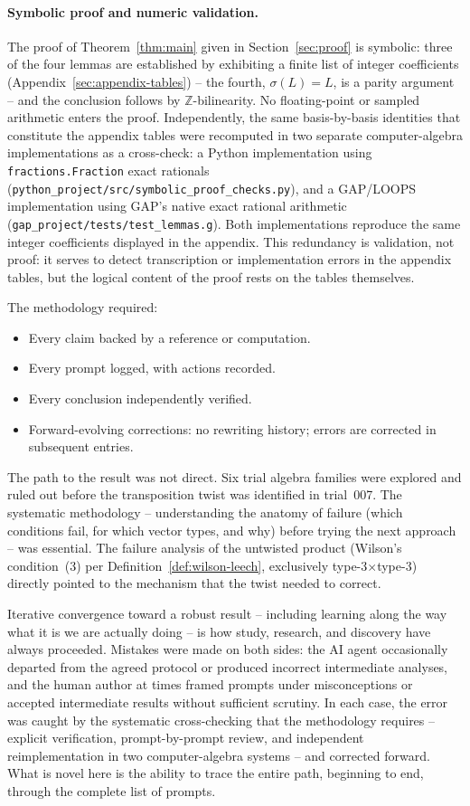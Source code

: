 \documentclass[twoside,english]{paper}
\numberwithin{equation}{section}
\numberwithin{figure}{section}
\theoremstyle{definition}
\theoremstyle{remark}
\newcommand{\ZZ}{\mathbb{Z}}
\begin{document}
\paragraph{Symbolic proof and numeric validation.}
The proof of Theorem~\ref{thm:main} given in Section~\ref{sec:proof}
is symbolic: three of the four lemmas are established by exhibiting a
finite list of integer coefficients (Appendix~\ref{sec:appendix-tables})
-- the fourth, $\sigma(L) = L$, is a parity argument -- and the
conclusion follows by $\ZZ$-bilinearity.  No floating-point
or sampled arithmetic enters the proof.  Independently, the same
basis-by-basis identities that constitute the appendix tables were
recomputed in two separate computer-algebra implementations as a
cross-check: a Python implementation using
\texttt{fractions.Fraction} exact rationals
(\texttt{python\_project/src/symbolic\_proof\_checks.py}), and a
GAP/LOOPS implementation using GAP's native exact rational arithmetic
(\texttt{gap\_project/tests/test\_lemmas.g}).  Both implementations
reproduce the same integer coefficients displayed in the appendix.
This redundancy is validation, not proof: it serves to detect
transcription or implementation errors in the appendix tables, but
the logical content of the proof rests on the tables themselves.

The methodology required:
\begin{itemize}
\item Every claim backed by a reference or computation.
\item Every prompt logged, with actions recorded.
\item Every conclusion independently verified.
\item Forward-evolving corrections: no rewriting history; errors are
  corrected in subsequent entries.
\end{itemize}

The path to the result was not direct.  Six trial algebra families
were explored and ruled out before the transposition twist was
identified in trial~007.  The systematic methodology --
understanding the anatomy of failure (which conditions fail, for which
vector types, and why) before trying the next approach -- was
essential.  The failure analysis of the untwisted product (Wilson's
condition~(3) per Definition~\ref{def:wilson-leech}, exclusively
type-3$\times$type-3) directly pointed to the
mechanism that the twist needed to correct.

Iterative convergence toward a robust result -- including learning
along the way what it is we are actually doing -- is how study,
research, and discovery have always proceeded.  Mistakes were made
on both sides: the AI agent occasionally departed from the agreed
protocol or produced incorrect intermediate analyses, and the human
author at times framed prompts under misconceptions or accepted
intermediate results without sufficient scrutiny.  In each case, the
error was caught by the systematic cross-checking that the
methodology requires -- explicit verification, prompt-by-prompt
review, and independent reimplementation in two computer-algebra
systems -- and corrected forward.  What is novel here is the
ability to trace the entire path, beginning to end, through the
complete list of prompts.
\end{document}
